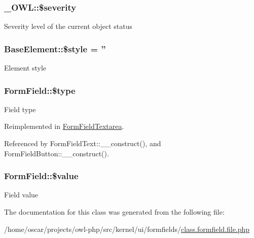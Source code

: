 \subsubsection[{\$severity}]{\setlength{\rightskip}{0pt plus 5cm}\_\-OWL::\$severity}\label{class__OWL_ad26b40a9dbbacb33e299b17826f8327c}
Severity level of the current object status 
\subsubsection[{\$style}]{\setlength{\rightskip}{0pt plus 5cm}BaseElement::\$style = ''}\label{classBaseElement_a429a3d642dd95f30e1059ef29564b87d}
Element style 
\subsubsection[{\$type}]{\setlength{\rightskip}{0pt plus 5cm}FormField::\$type}\label{classFormField_a37bed21a1891e95be0e4a697e45ba51b}
Field type 

Reimplemented in \hyperlink{classFormFieldTextarea_a85348034822c70694fc8640bfcacc04d}{FormFieldTextarea}.



Referenced by FormFieldText::\_\-\_\-construct(), and FormFieldButton::\_\-\_\-construct().

\subsubsection[{\$value}]{\setlength{\rightskip}{0pt plus 5cm}FormField::\$value}\label{classFormField_a3c01e89834248eec8e2f145fbcfa0fbc}
Field value 

The documentation for this class was generated from the following file:\begin{DoxyCompactItemize}
\item 
/home/oscar/projects/owl-\/php/src/kernel/ui/formfields/\hyperlink{class_8formfield_8file_8php}{class.formfield.file.php}\end{DoxyCompactItemize}
